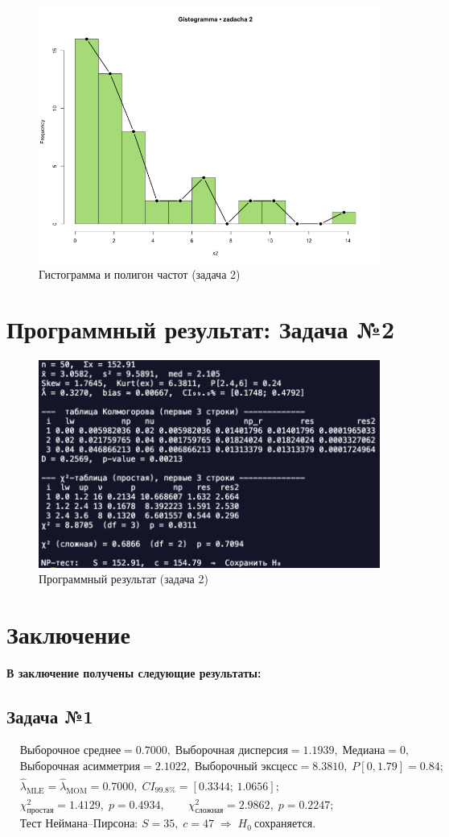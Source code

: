 \documentclass[areasetadvanced]{scrartcl}
\begin{document}
\begin{figure}[H]\centering
\includegraphics[width=.72\linewidth]{fig/hist_2.png}
\caption{Гистограмма и полигон частот (задача 2)}
\end{figure}


\newpage
\section{Программный результат: Задача №2}
\begin{figure}[H]\centering
  \includegraphics[width=0.5\linewidth]{Final2.png}
  \caption{Программный результат (задача 2)}
\end{figure}


\newpage
\section*{Заключение}
\textbf{В заключение получены следующие результаты:}

\subsection*{Задача №1}
\[
\begin{aligned}
&\text{Выборочное среднее}=0.7000,\;
  \text{Выборочная дисперсия}=1.1939,\;
  \text{Медиана}=0,\\
&\text{Выборочная асимметрия}=2.1022,\;
  \text{Выборочный эксцесс}=8.3810,\;
  P[0,1.79]=0.84;\\[4pt]
%
&\hat{\lambda}_{\text{MLE}}=\hat{\lambda}_{\text{MOM}}=0.7000,\;
  CI_{99.8\%}=[0.3344;\,1.0656];\\[4pt]
%
&\chi^{2}_{\text{простая}}=1.4129,\; p=0.4934,\qquad
  \chi^{2}_{\text{сложная}}=2.9862,\; p=0.2247;\\[4pt]
%
&\text{Тест Неймана–Пирсона: } S=35,\; c=47
  \;\Rightarrow\; H_0\ \text{сохраняется}.
\end{aligned}
\]
\end{document}
